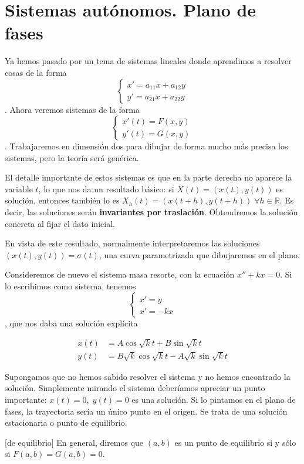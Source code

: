 \section{Sistemas autónomos. Plano de fases}

Ya hemos pasado por un tema de sistemas lineales donde aprendimos a resolver cosas de la forma \[ \begin{cases}x'= a_{11}x + a_{12}y \\ y'=a_{21}x + a_{22}y \end{cases} \]. Ahora veremos sistemas de la forma \[ \begin{cases} x'(t) = F(x,y) \\ y'(t) = G(x,y) \end{cases} \]. Trabajaremos en dimensión dos para dibujar de forma mucho más precisa los sistemas, pero la teoría será genérica.

El detalle importante de estos sistemas es que en la parte derecha no aparece la variable $t$, lo que nos da un resultado básico: si $X(t) = (x(t), y(t))$ es solución, entonces también lo es $X_h(t) = (x(t+h), y(t+h))\; ∀h∈ℝ$. Es decir, las soluciones serán \textbf{invariantes por traslación}. Obtendremos la solución concreta al fijar el dato inicial.

En vista de este resultado, normalmente interpretaremos las soluciones $(x(t), y(t)) = σ(t)$, una curva parametrizada que dibujaremos en el plano.

Consideremos de nuevo el sistema masa resorte, con la ecuación $x'' +kx = 0$. Si lo escribimos como sistema, tenemos \[ \begin{cases} x' = y \\ x' = -kx \end{cases} \], que nos daba una solución explícita 

\begin{align*}
x(t) &= A\cos \sqrt{k}t + B \sin \sqrt{k} t \\
y(t) &= B\sqrt{k}\cos \sqrt{k} t - A \sqrt{k}\sin \sqrt{k} t
\end{align*}

Supongamos que no hemos sabido resolver el sistema y no hemos encontrado la solución. Simplemente mirando el sistema deberíamos apreciar un punto importante: $x(t) = 0,\;y(t) = 0$ es una solución. Si lo pintamos en el plano de fases, la trayectoria sería un único punto en el origen. Se trata de una solución estacionaria o punto de equilibrio.

\begin{definition}[de equilibrio]
En general, diremos que $(a,b)$ es un punto de equilibrio si y sólo si $F(a,b) = G(a,b) = 0$.
\end{definition}

